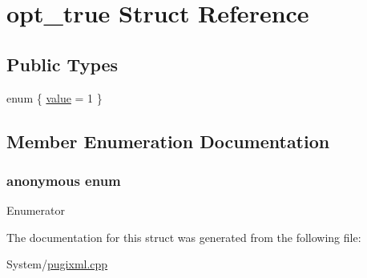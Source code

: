 \hypertarget{structopt__true}{\section{opt\-\_\-true Struct Reference}
\label{structopt__true}
}
\subsection*{Public Types}
\begin{DoxyCompactItemize}
\item 
enum \{ \hyperlink{structopt__true_a93a7039f202aca3a935c98aa8e069ea5a3f8405655cc98a5710236f177e042b72}{value} = 1
 \}
\end{DoxyCompactItemize}


\subsection{Member Enumeration Documentation}
\hypertarget{structopt__true_a93a7039f202aca3a935c98aa8e069ea5}{\subsubsection[{anonymous enum}]{\setlength{\rightskip}{0pt plus 5cm}anonymous enum}}\label{structopt__true_a93a7039f202aca3a935c98aa8e069ea5}
\begin{Desc}
\item[Enumerator]\par
\begin{description}
\item[{\em 
\hypertarget{structopt__true_a93a7039f202aca3a935c98aa8e069ea5a3f8405655cc98a5710236f177e042b72}{value}\label{structopt__true_a93a7039f202aca3a935c98aa8e069ea5a3f8405655cc98a5710236f177e042b72}
}]\end{description}
\end{Desc}


The documentation for this struct was generated from the following file\-:\begin{DoxyCompactItemize}
\item 
System/\hyperlink{pugixml_8cpp}{pugixml.\-cpp}\end{DoxyCompactItemize}
